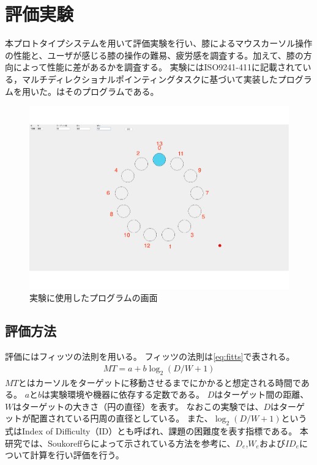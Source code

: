 \documentclass[submit, techrep]{ipsj}
\begin{document}
\section{評価実験}
本プロトタイプシステムを用いて評価実験を行い、膝によるマウスカーソル操作の性能と、ユーザが感じる膝の操作の難易、疲労感を調査する。加えて、膝の方向によって性能に差があるかを調査する。
実験にはISO9241-411\cite{9241411}に記載されている，マルチディレクショナルポインティングタスクに基づいて実装したプログラムを用いた。はそのプログラムである。
\begin{figure}[tb]
	\begin{center}
		\includegraphics[angle = 270, width = 0.9\hsize]{./figures/1.pdf}
	\end{center}
	\caption{実験に使用したプログラムの画面}
	\label{img:mdpt}
\end{figure}
\subsection{評価方法}
評価にはフィッツの法則\cite{fitts}を用いる。
フィッツの法則は\ref{eq:fitts}で表される。
\begin{eqnarray}
	MT = a + b\log_2{(D/W + 1)}
	\label{eq:fitts}
\end{eqnarray}
$MT$とはカーソルをターゲットに移動させるまでにかかると想定される時間である。
$a$と$b$は実験環境や機器に依存する定数である。
$D$はターゲット間の距離、$W$はターゲットの大きさ（円の直径）を表す。
なおこの実験では、$D$はターゲットが配置されている円周の直径としている。
また、$\log_2{(D/W + 1)}$という式はIndex of Difficulty（ID）とも呼ばれ、課題の困難度を表す指標である。
本研究では、Soukoreffら\cite{Soukoreff:2004:TSP:1056153.1056155}によって示されている方法を参考に、$D_e$,$W_e$および$ID_e$について計算を行い評価を行う。
\end{document}
